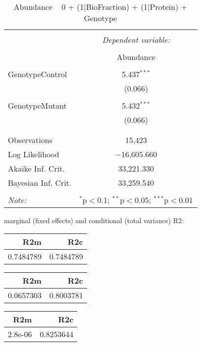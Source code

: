 \documentclass[11pt]{report}
\begin{document}
\begin{table}[!htbp] \centering 
  \caption{Abundance ~ 0 + (1|BioFraction) + (1|Protein) + Genotype} 
  \label{} 
\begin{tabular}{@{\extracolsep{5pt}}lc} 
\\[-1.8ex]\hline 
\hline \\[-1.8ex] 
 & \multicolumn{1}{c}{\textit{Dependent variable:}} \\ 
\cline{2-2} 
\\[-1.8ex] & Abundance \\ 
\hline \\[-1.8ex] 
 GenotypeControl & 5.437$^{***}$ \\ 
  & (0.066) \\ 
  & \\ 
 GenotypeMutant & 5.432$^{***}$ \\ 
  & (0.066) \\ 
  & \\ 
\hline \\[-1.8ex] 
Observations & 15,423 \\ 
Log Likelihood & $-$16,605.660 \\ 
Akaike Inf. Crit. & 33,221.330 \\ 
Bayesian Inf. Crit. & 33,259.540 \\ 
\hline 
\hline \\[-1.8ex] 
\textit{Note:}  & \multicolumn{1}{r}{$^{*}$p$<$0.1; $^{**}$p$<$0.05; $^{***}$p$<$0.01} \\ 
\end{tabular} 
\end{table} 
marginal (fixed effects) and conditional (total variance) R2:

\begin{tabular}{r|r}
\hline
R2m & R2c\\
\hline
0.7484789 & 0.7484789\\
\hline
\end{tabular}

\begin{tabular}{r|r}
\hline
R2m & R2c\\
\hline
0.0657303 & 0.8003781\\
\hline
\end{tabular}

\begin{tabular}{r|r}
\hline
R2m & R2c\\
\hline
2.8e-06 & 0.8253644\\
\hline
\end{tabular}
\end{document}
